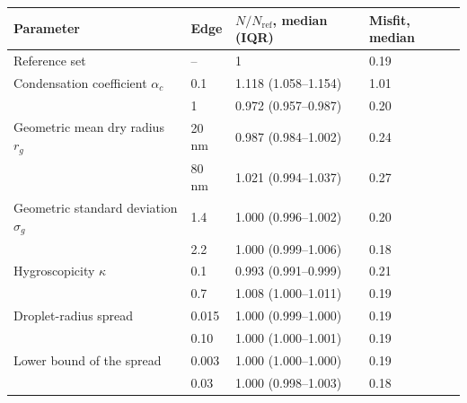\begin{tabular}{llll}
\toprule
Parameter & Edge & $N/N_\mathrm{ref}$, median (IQR) & Misfit, median \\
\midrule
Reference set & -- & 1 & 0.19 \\
Condensation coefficient $\alpha_c$ & 0.1 & 1.118 (1.058--1.154) & 1.01 \\
 & 1 & 0.972 (0.957--0.987) & 0.20 \\
Geometric mean dry radius $r_g$ & 20\,nm & 0.987 (0.984--1.002) & 0.24 \\
 & 80\,nm & 1.021 (0.994--1.037) & 0.27 \\
Geometric standard deviation $\sigma_g$ & 1.4 & 1.000 (0.996--1.002) & 0.20 \\
 & 2.2 & 1.000 (0.999--1.006) & 0.18 \\
Hygroscopicity $\kappa$ & 0.1 & 0.993 (0.991--0.999) & 0.21 \\
 & 0.7 & 1.008 (1.000--1.011) & 0.19 \\
Droplet-radius spread & 0.015 & 1.000 (0.999--1.000) & 0.19 \\
 & 0.10 & 1.000 (1.000--1.001) & 0.19 \\
Lower bound of the spread & 0.003 & 1.000 (1.000--1.000) & 0.19 \\
 & 0.03 & 1.000 (0.998--1.003) & 0.18 \\
\bottomrule
\end{tabular}
